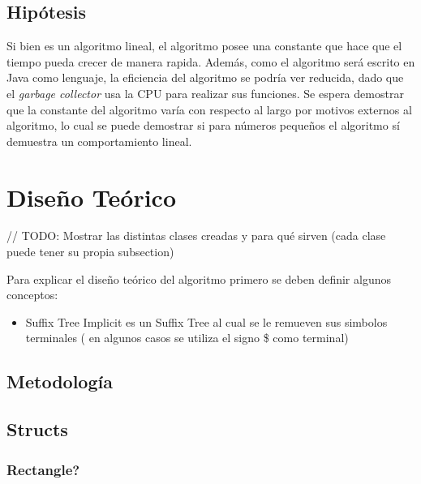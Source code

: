 \documentclass[letterpaper,10pt]{article}
\begin{document}
	\subsection{Hipótesis}

	Si bien es un algoritmo lineal, el algoritmo posee una constante que hace que el tiempo pueda crecer de manera rapida. Además, como el algoritmo será escrito en Java como lenguaje,
	la eficiencia del algoritmo se podría ver reducida, dado que el \textit{garbage collector} usa la CPU para realizar sus funciones. Se espera demostrar que la constante del algoritmo
	varía con respecto al largo por motivos externos al algoritmo, lo cual se puede demostrar si para números pequeños el algoritmo sí demuestra un comportamiento lineal.

	\newpage

	\section{Diseño Teórico}

	// TODO: Mostrar las distintas clases creadas y para qué sirven (cada clase puede tener su propia subsection)

	Para explicar el diseño teórico del algoritmo primero se deben definir algunos conceptos:
	\begin{itemize}
		\item Suffix Tree Implicit es un Suffix Tree al cual se le remueven sus simbolos terminales ( en algunos casos se utiliza el signo \$ como terminal)
	\end{itemize}

	\subsection{Metodología}

	\subsection{Structs}

	\subsubsection{Rectangle?}
\end{document}
